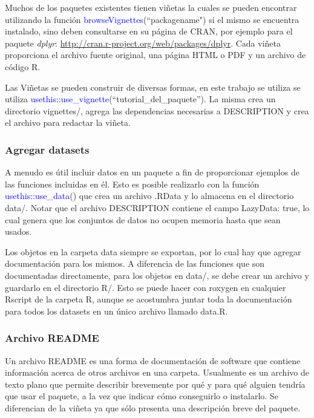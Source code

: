 Muchos de los paquetes existentes tienen viñetas la cuales se pueden encontrar utilizando la función \textcolor{blue}{browseVignettes}(``packagename") si el mismo se encuentra instalado, sino deben consultarse en su página de CRAN, por ejemplo para el paquete \emph{dplyr}: \url{http://cran.r-project.org/web/packages/dplyr}. Cada viñeta proporciona el archivo fuente original, una página HTML o PDF y un archivo de código R. 

Las Viñetas se pueden construir de diversas formas, en este trabajo se utiliza se utiliza \textcolor{blue}{usethis::use\_vignette}(``tutorial\_del\_paquete''). La misma crea un directorio vignettes/, agrega las dependencias necesarias a DESCRIPTION y crea el archivo para redactar la viñeta. 


\subsubsection{Agregar datasets}

A menudo es útil incluir datos en un paquete a fin de proporcionar ejemplos de las funciones incluidas en él. Esto es posible realizarlo con la función \textcolor{blue}{usethis::use\_data}() que crea un archivo .RData y lo almacena en el directorio data/.  Notar que el archivo DESCRIPTION contiene el campo LazyData: true, lo cual genera que los conjuntos de datos no ocupen memoria hasta que sean usados.

Los objetos en la carpeta data siempre se exportan, por lo cual hay que agregar documentación para los mismos. A diferencia de las funciones que son documentadas directamente, para los objetos en data/, se debe crear un archivo y guardarlo en el directorio R/. Esto se puede hacer con roxygen en cualquier Rscript de la carpeta R, aunque se acostumbra juntar toda la documentación para todos los datasets en un único archivo llamado data.R.\\

\subsubsection{Archivo README}

Un archivo README es una forma de documentación de software que contiene información acerca de otros archivos en una carpeta. Usualmente es un archivo de texto plano que permite describir brevemente por qué y para qué alguien tendría que usar el paquete, a la vez que indicar cómo conseguirlo o instalarlo. Se diferencian de la viñeta ya que sólo presenta una descripción breve del paquete.


